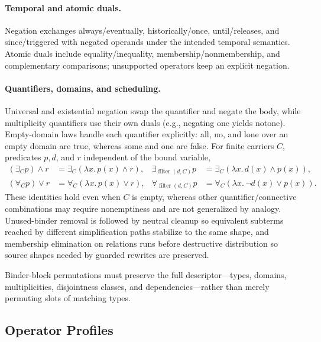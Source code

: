 \paragraph{Temporal and atomic duals.}
Negation exchanges always/eventually, historically/once, until/releases, and
since/triggered with negated operands under the intended temporal semantics.
Atomic duals include equality/inequality, membership/nonmembership, and
complementary comparisons; unsupported operators keep an explicit negation.

\paragraph{Quantifiers, domains, and scheduling.}
Universal and existential negation swap the quantifier and negate the body,
while multiplicity quantifiers use their own duals (e.g., negating
\textsf{one} yields \textsf{notone}). Empty-domain laws handle each quantifier
explicitly: \textsf{all}, \textsf{no}, and \textsf{lone} over an empty domain
are true, whereas \textsf{some} and \textsf{one} are false. For finite
carriers $C$, predicates $p,d$, and $r$ independent of the bound variable,
\begin{align*}
 (\exists_C p)\land r&=\exists_C(\lambda x.\,p(x)\land r),&
 \exists_{\operatorname{filter}(d,C)}p&=\exists_C(\lambda x.\,d(x)\land p(x)),\\
 (\forall_C p)\lor r&=\forall_C(\lambda x.\,p(x)\lor r),&
 \forall_{\operatorname{filter}(d,C)}p&=\forall_C(\lambda x.\,\neg d(x)\lor p(x)).
\end{align*}
These identities hold even when $C$ is empty, whereas other quantifier/connective
combinations may require nonemptiness and are not generalized by analogy.
Unused-binder removal is followed by neutral cleanup so equivalent subterms
reached by different simplification paths stabilize to the same shape, and
membership elimination on relations runs before destructive distribution so
source shapes needed by guarded rewrites are preserved.

Binder-block permutations must preserve the full descriptor—types, domains,
multiplicities, disjointness classes, and dependencies—rather than merely
permuting slots of matching types.

\subsection{Operator Profiles}

